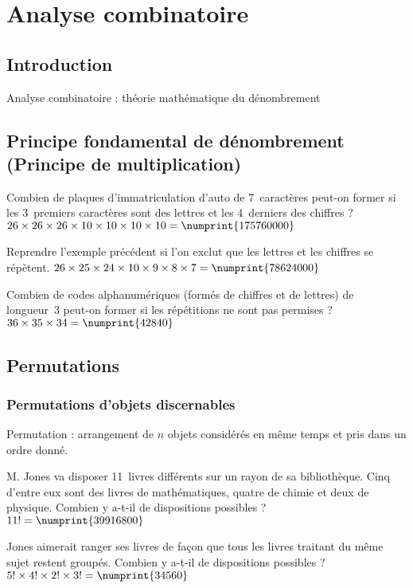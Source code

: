\chapter{Analyse combinatoire}
\section{Introduction}
Analyse combinatoire : théorie mathématique du dénombrement


\section[Principe fondamental de dénombrement (Principe de multiplication)]{Principe fondamental de dénombrement\\(Principe de multiplication)}

 Combien de plaques d’immatriculation d’auto de 7~caractères peut-on former si les 3~premiers caractères sont des lettres et les 4~derniers des chiffres ?
 $26 \times 26 \times 26 \times 10 \times 10 \times 10 \times 10 = \numprint{175760000}$

 Reprendre l’exemple précédent si l’on exclut que les lettres et les chiffres se répètent.
 $26 \times 25 \times 24 \times 10 \times 9 \times 8 \times 7 = \numprint{78624000}$

 Combien de codes alphanumériques (formés de chiffres et de lettres) de longueur~3 peut-on former si les répétitions ne sont pas permises ?
\sol $36 \times 35 \times 34 = \numprint{42840}$


\section{Permutations}
\subsection{Permutations d’objets discernables}
Permutation : arrangement de $n$ objets considérés en même temps et pris dans un ordre donné.

 M. Jones va disposer 11~livres différents sur un rayon de sa bibliothèque. Cinq d’entre eux sont des livres de mathématiques, quatre de chimie et deux de physique. Combien y a-t-il de dispositions possibles ?
\sol $11! = \numprint{39916800}$

\noindent Jones aimerait ranger ses livres de façon que tous les livres traitant du même sujet restent groupés. Combien y a-t-il de dispositions possibles ?
 $5! \times 4! \times 2! \times 3! = \numprint{34560}$

